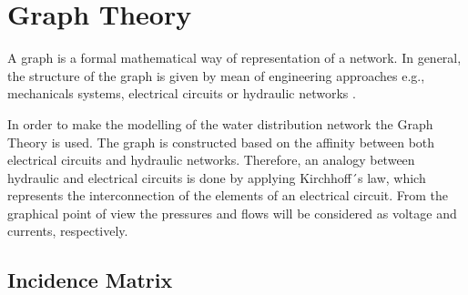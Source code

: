 \section{Graph Theory}  
\label{GraphTheory}
A graph is a formal mathematical way of representation of a network. In general, the structure of the graph is given by mean of engineering approaches e.g., 
mechanicals systems, electrical circuits or hydraulic networks \cite{graph_intro}. 

In order to make the modelling of the water distribution network the Graph Theory is used. The graph is constructed based on the affinity between both
electrical circuits and hydraulic networks. Therefore, an analogy between hydraulic and electrical circuits is done by applying Kirchhoff´s law, 
which represents the interconnection of the elements of an electrical circuit.  
From the graphical point of view the pressures and flows will be considered as 
voltage and currents, respectively. 

\subsection{Incidence Matrix} 

%
%


 
 
 